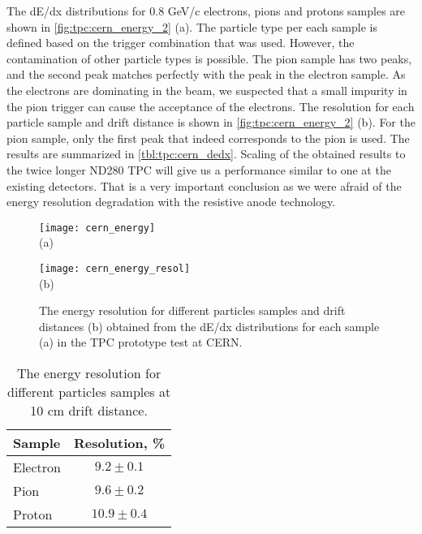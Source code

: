 \documentclass[../main.tex]{subfiles}
\begin{document}
The dE/dx distributions for 0.8 GeV/c electrons, pions and protons samples are shown in \autoref{fig:tpc:cern_energy_2} (a). The particle type per each sample is defined based on the trigger combination that was used. However, the contamination of other particle types is possible. The pion sample has two peaks, and the second peak matches perfectly with the peak in the electron sample. As the electrons are dominating in the beam, we suspected that a small impurity in the pion trigger can cause the acceptance of the electrons. The resolution for each particle sample and drift distance is shown in \autoref{fig:tpc:cern_energy_2} (b). For the pion sample, only the first peak that indeed corresponds to the pion is used. The results are summarized in \autoref{tbl:tpc:cern_dedx}. Scaling of the obtained results to the twice longer ND280 TPC will give us a performance similar to one at the existing detectors. That is a very important conclusion as we were afraid of the energy resolution degradation with the resistive anode technology.

\begin{figure}[!ht]
  \centering
  \begin{minipage}{0.49\linewidth}
    \centering
    \texttt{[image: cern\_energy]} \\ (a)
  \end{minipage}
  \begin{minipage}{0.49\linewidth}
    \centering
    \texttt{[image: cern\_energy\_resol]} \\ (b)
  \end{minipage}
  \caption{The energy resolution for different particles samples and drift distances (b) obtained from the dE/dx distributions for each sample (a) in the TPC prototype test at CERN.}
  \label{fig:tpc:cern_energy_2}
\end{figure}

\begin{table}[!ht]
  \centering
  \begin{tabular}{|l|c|}
  \hline
  \hline
  Sample    & Resolution, \% \\
  \hline
  Electron  & $9.2\pm0.1$ \\
  Pion      & $9.6\pm0.2$ \\
  Proton    & $10.9\pm0.4$ \\
  \hline
  \end{tabular}
  \caption{The energy resolution for different particles samples at 10 cm drift distance.}
  \label{tbl:tpc:cern_dedx}
\end{table}
\end{document}
